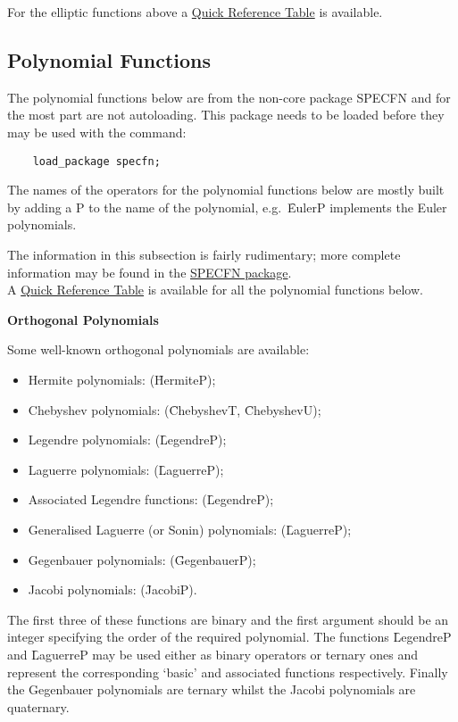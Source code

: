 For the elliptic functions above
a \hyperlink{SPECFNTAB3}{Quick Reference Table} is available.

\subsection{Polynomial Functions}
The polynomial functions below are from the non-core package SPECFN
and for the most part are not autoloading. This package needs to be loaded
before they may be used with the command:
\begin{verbatim}
    load_package specfn;
\end{verbatim}
The names of the {\REDUCE} operators for the polynomial functions below
are mostly built by adding a P to the name of the polynomial,
e.g.\ \f{EulerP} implements the Euler polynomials.

The information in this subsection is fairly rudimentary; more complete
information may be found in the \hyperlink{POLYFN}{SPECFN package}.\\
A \hyperlink{SPECFNTAB4}{Quick Reference Table} is available for all the
polynomial functions below.

\textbf{Orthogonal Polynomials}
 

Some well-known orthogonal polynomials are available:
\begin{itemize}
\item Hermite polynomials: (\f{HermiteP});
\item Chebyshev polynomials: (\f{ChebyshevT}, \f{ChebyshevU});
\item Legendre polynomials: (\f{LegendreP});
\item Laguerre polynomials: (\f{LaguerreP});
\item Associated Legendre functions: (\f{LegendreP});
\item Generalised Laguerre (or Sonin) polynomials: (\f{LaguerreP});
\item Gegenbauer polynomials: (\f{GegenbauerP});
\item Jacobi polynomials: (\f{JacobiP}).
\end{itemize}
The first three of these functions are binary and the first
argument should be an integer specifying the order of the
required polynomial. The functions \f{LegendreP} and \f{LaguerreP} may be used
either as binary operators or ternary ones and represent the corresponding
`basic' and associated functions respectively.
Finally the Gegenbauer polynomials are ternary whilst the Jacobi polynomials
are quaternary.

